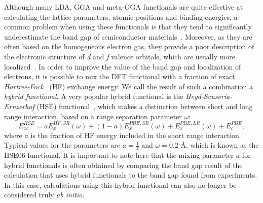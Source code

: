 \begin{refsection}
 \label{dft:sec-hybrid} 
Although many \gls{LDA}, \gls{GGA} and meta-GGA functionals are quite effective at 
calculating the lattice parameters, atomic positions and binding energies, a 
common problem when using these functionals is that they tend to significantly 
underestimate the band gap of semiconductor materials~\cite{Tran2007}. 
Moreover, as they are often based on the homogeneous electron gas, they 
provide a poor description of the electronic structure of \textit{d} and 
\textit{f} valence orbitals, which are usually more localized~\cite{Bengone2000}. 
In order to improve the value of the band gap and localization of 
electrons, it is possible to mix the \gls{DFT} functional with a fraction of exact 
\textit{Hartree-Fock}~\cite{Slater1951} (\gls{HF}) exchange energy. We call the 
result of such a combination a \textit{hybrid functional}. A very popular 
hybrid functional is the \textit{Heyd-Scuseria-Ernzerhof} (\gls{HSE}) 
functional~\cite{Heyd2003}, which makes a distinction between short and long 
range interaction, based on a range separation parameter $\omega$: 
\begin{equation} 
E_{xc}^{HSE} = a E_{x}^{HF,SR}(\omega) + (1-a) E_{x}^{PBE,SR}(\omega) + 
E_{x}^{PBE,LR}(\omega) + E_{c}^{PBE}, 
\end{equation} 
where $a$ is the fraction of \gls{HF} energy included in the short range 
interaction. Typical values for the parameters are $a = \frac{1}{4}$ and 
$\omega = 0.2$ \AA, which is known as the \gls{HSE}06 functional. It is important to 
note here that the mixing parameter $a$ for hybrid functionals is often 
obtained by comparing the band gap result of the calculation that uses hybrid 
functionals to the band gap found from experiments. In this case, calculations 
using this hybrid functional can also no longer be considered truly \textit{ab 
initio}. 
 

\end{refsection}
